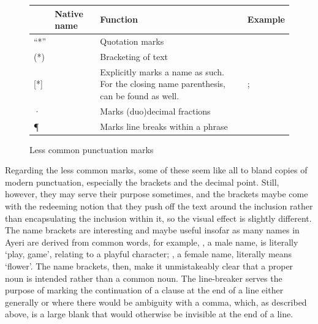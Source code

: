 \begin{figure}[htp]
\caption{Less common punctuation marks}
\begin{tabu} to 
\toprule
\tableheaderfont

	& Native name
	& Function
	& Example
	\\
	
\toprule

“*”
	& 
	& Quotation marks
	& 
	\\
	
\midrule

(*)
	& 
	& Bracketing of text
	& 
	\\

\midrule

[*]
	& 
	& Explicitly marks a name as such. For the closing name parenthesis, 
		 can be found as well.
	& ; 
	\\
	
\midrule

·
	& 
	& Marks (duo)decimal fractions
	& 
	\\
	
\midrule

¶
	& 
	& Marks line breaks within a phrase
	& 
	\\

\bottomrule
\end{tabu}
\label{fig:thpunctuncom}
\end{figure}

Regarding the less common marks, some of these seem like all to bland copies of 
modern punctuation, especially the brackets and the decimal point. Still, 
however, they may serve their purpose sometimes, and the brackets \ayr{(*)} 
maybe come with the redeeming notion that they push off the text around the 
inclusion rather than encapsulating the inclusion within it, so the visual 
effect is slightly different. The name brackets \ayr{[*]} are interesting and 
maybe useful insofar as many names in Ayeri are derived from common words, for 
example, , a male name, is literally `play, game', relating 
to a playful character; , a female name, literally means 
`flower'. The name brackets, then, make it unmistakeably clear that a proper 
noun is intended rather than a common noun. The line-breaker  serves the 
purpose of marking the continuation of a clause at the end of a line either 
generally or where there would be ambiguity with a comma, which, as described 
above, is a large blank that would otherwise be invisible at the end of a line.

